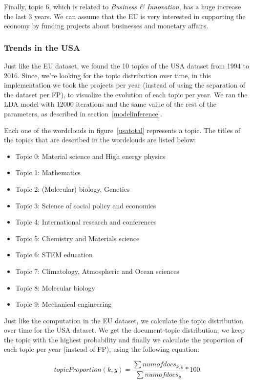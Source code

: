 \documentclass[12pt]{report}
\begin{document}
Finally, topic 6, which is related to \emph{Business \& Innovation}, has a huge
increase the last 3 years. We can assume that the EU is very interested in
supporting the economy by funding projects about businesses and monetary
affairs.

\subsubsection{Trends in the USA}
\label{usaevolution}
Just like the EU dataset, we found the 10 topics of the USA dataset
from 1994 to 2016. Since, we're looking for the topic distribution
over time, in this implementation we took the projects per year
(instead of using the separation of the dataset per FP), to visualize
the evolution of each topic per year. We ran the LDA model with 12000
iterations and the same value of the rest of the
parameters, as described in section~\ref{modelinference}.

Each one of the wordclouds in figure~\ref{usatotal} represents a topic.
The titles of the topics that are described in the wordclouds are listed below:

\begin{itemize}
\item[] Topic 0: Material science and High energy physics
\item[] Topic 1: Mathematics
\item[] Topic 2: (Molecular) biology, Genetics
\item[] Topic 3: Science of social policy and economics
\item[] Topic 4: International research and conferences
\item[] Topic 5: Chemistry and Materials science
\item[] Topic 6: STEM education
\item[] Topic 7: Climatology, Atmospheric and Ocean sciences
\item[] Topic 8: Molecular biology 
\item[] Topic 9: Mechanical engineering
\end{itemize}

Just like the computation in the EU dataset, we calculate the topic 
distribution over time for the USA dataset. We get the document-topic 
distribution, we keep the topic with the highest probability and finally 
we calculate the proportion of each topic per
year (instead of FP), using the following equation:

\begin{equation}
topicProportion(k, y) = \frac{\sum num of docs_{k,y}}{\sum num of docs_{y}} * 100
\end{equation}
\end{document}
